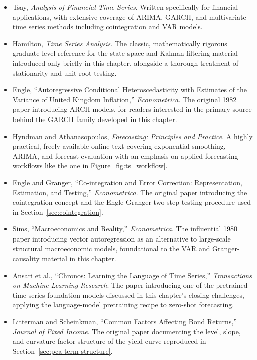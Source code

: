 \documentclass[../ai_in_finance]{subfiles}
\begin{document}
\begin{itemize}
    \item Tsay, \emph{Analysis of Financial Time Series}. Written specifically for financial applications, with extensive coverage of ARIMA, GARCH, and multivariate time series methods including cointegration and VAR models.
    \item Hamilton, \emph{Time Series Analysis}. The classic, mathematically rigorous graduate-level reference for the state-space and Kalman filtering material introduced only briefly in this chapter, alongside a thorough treatment of stationarity and unit-root testing.
    \item Engle, ``Autoregressive Conditional Heteroscedasticity with Estimates of the Variance of United Kingdom Inflation,'' \emph{Econometrica}. The original 1982 paper introducing ARCH models, for readers interested in the primary source behind the GARCH family developed in this chapter.
    \item Hyndman and Athanasopoulos, \emph{Forecasting: Principles and Practice}. A highly practical, freely available online text covering exponential smoothing, ARIMA, and forecast evaluation with an emphasis on applied forecasting workflows like the one in Figure~\ref{fig:ts_workflow}.
    \item Engle and Granger, ``Co-integration and Error Correction: Representation, Estimation, and Testing,'' \emph{Econometrica}. The original paper introducing the cointegration concept and the Engle-Granger two-step testing procedure used in Section~\ref{sec:cointegration}.
    \item Sims, ``Macroeconomics and Reality,'' \emph{Econometrica}. The influential 1980 paper introducing vector autoregression as an alternative to large-scale structural macroeconomic models, foundational to the VAR and Granger-causality material in this chapter.
    \item Ansari et al., ``Chronos: Learning the Language of Time Series,'' \emph{Transactions on Machine Learning Research}. The paper introducing one of the pretrained time-series foundation models discussed in this chapter's closing challenges, applying the language-model pretraining recipe to zero-shot forecasting.
    \item Litterman and Scheinkman, ``Common Factors Affecting Bond Returns,'' \emph{Journal of Fixed Income}. The original paper documenting the level, slope, and curvature factor structure of the yield curve reproduced in Section~\ref{sec:pca-term-structure}.
\end{itemize}
\end{document}
